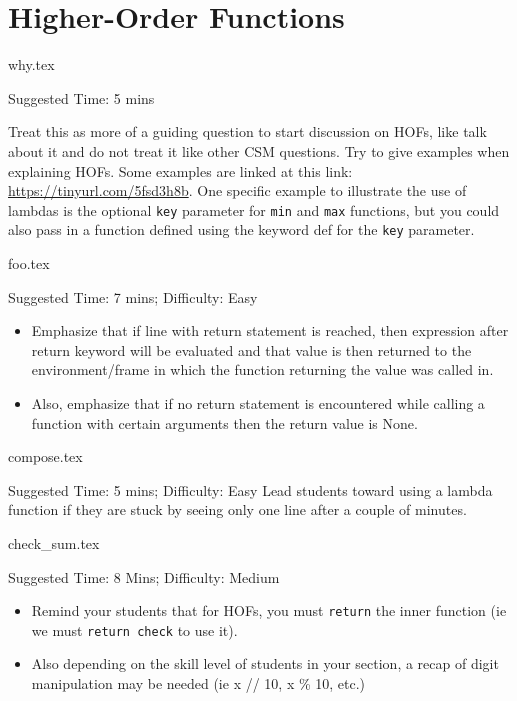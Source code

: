 \documentclass{exam}
\begin{document}
\section{Higher-Order Functions}
\begin{questions}
    {why.tex}
    \begin{questionmeta}
        Suggested Time: 5 mins
        
        Treat this as more of a guiding question to start discussion on HOFs, like talk about it and do not treat it like other CSM questions. Try to give examples when explaining HOFs. Some examples are linked at this link: \url{https://tinyurl.com/5fsd3h8b}.
        One specific example to illustrate the use of lambdas is the optional \lstinline{key} parameter for \lstinline{min} and \lstinline{max} functions, but you could also pass in a function defined using the keyword def for the \lstinline{key} parameter.
    \end{questionmeta}
    
    {foo.tex}
    \begin{questionmeta}
        Suggested Time: 7 mins; Difficulty: Easy
        \begin{itemize}
            \item Emphasize that if line with return statement is reached, then expression after return keyword will be evaluated and that value is then returned to the environment/frame in which the function returning the value was called in. 
            \item Also, emphasize that if no return statement is encountered while calling a function with certain arguments then the return value is None.
        \end{itemize}
    \end{questionmeta}

    {compose.tex}
    \begin{questionmeta}
        Suggested Time: 5 mins; Difficulty: Easy
        Lead students toward using a lambda function if they are stuck by seeing only one line after a couple of minutes.
    \end{questionmeta}

    {check_sum.tex}
    \begin{questionmeta}
        Suggested Time: 8 Mins; Difficulty: Medium
        \begin{itemize}
            \item Remind your students that for HOFs, you must \lstinline{return} the inner function (ie we must \lstinline{return check} to use it).
            \item Also depending on the skill level of students in your section, a recap of digit manipulation may be needed (ie x // 10, x \% 10, etc.)
        \end{itemize}
    \end{questionmeta}


\end{questions}
\end{document}
